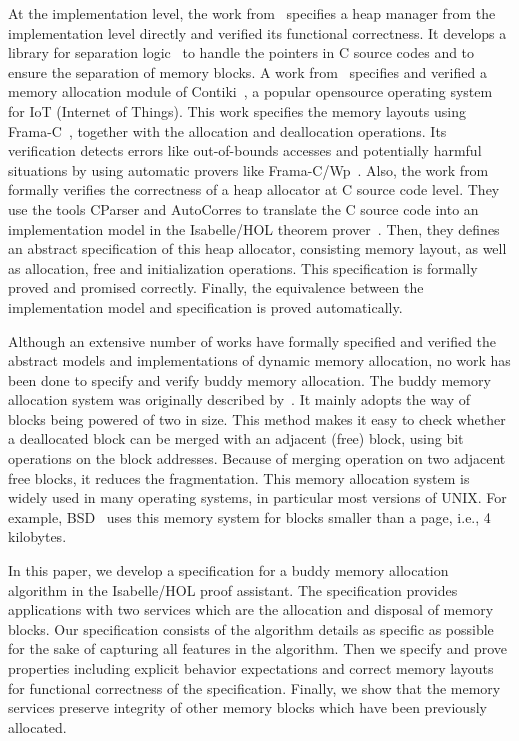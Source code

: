 At the implementation level, the work from~\cite{reg_marti} specifies a heap manager from the implementation level directly and verified its functional correctness. It develops a library for separation logic~\cite{reg_reynolds} to handle the pointers in C source codes and to ensure the separation of memory blocks. A work from~\cite{reg_mangano} specifies and verified a memory allocation module of Contiki~\cite{reg_dunkers}, a popular opensource operating system for IoT (Internet of Things). This work specifies the memory layouts using Frama-C~\cite{reg_kirchner}, together with the allocation and deallocation operations. Its verification detects errors like out-of-bounds accesses and potentially harmful situations by using automatic provers like Frama-C/Wp~\cite{reg_allan}. Also, the work from~\cite{reg_sahebolamri} formally verifies the correctness of a heap allocator at C source code level. They use the tools CParser and AutoCorres to translate the C source code into an implementation model in the Isabelle/HOL theorem prover~\cite{reg_Isabelle/HOL}. Then, they defines an abstract specification of this heap allocator, consisting memory layout, as well as allocation, free and initialization operations. This specification is formally proved and promised correctly. Finally, the equivalence between the implementation model and specification is proved automatically.

Although an extensive number of works have formally specified and verified the abstract models and implementations of dynamic memory allocation, no work has been done to specify and verify buddy memory allocation. The buddy memory allocation system was originally described by~\cite{reg_knowlton}. It mainly adopts the way of blocks being powered of two in size. This method makes it easy to check whether a deallocated block can be merged with an adjacent (free) block, using bit operations on the block addresses. Because of merging operation on two adjacent free blocks, it reduces the fragmentation. This memory allocation system is widely used in many operating systems, in particular most versions of UNIX. For example, BSD~\cite{reg_mckusick} uses this memory system for blocks smaller than a page, i.e., 4 kilobytes.

In this paper, we develop a specification for a buddy memory allocation algorithm in the Isabelle/HOL proof assistant. The specification provides applications with two services which are the allocation and disposal of memory blocks. Our specification consists of the algorithm details as specific as possible for the sake of capturing all features in the algorithm. Then we specify and prove properties including explicit behavior expectations and correct memory layouts for functional correctness of the specification. Finally, we show that the memory services preserve integrity of other memory blocks which have been previously allocated.

